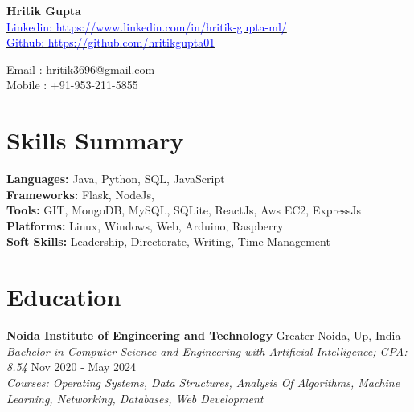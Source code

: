 \documentclass[9pt]{article}
\begin{document}
\small

\begin{minipage}[t]{0.6\textwidth}
  {\LARGE\textbf{Hritik Gupta}} \\
  \vspace{2pt}
  \href{https://www.linkedin.com/in/hritik-gupta-ml/}{\textcolor{blue}{Linkedin: https://www.linkedin.com/in/hritik-gupta-ml/}} \\
  \href{https://github.com/hritikgupta01}{\textcolor{blue}{Github: https://github.com/hritikgupta01}}
\end{minipage}%
\begin{minipage}[t]{0.4\textwidth}
  \raggedleft
  Email : \href{mailto:hritik3696@gmail.com}{hritik3696@gmail.com} \\
  Mobile : +91-953-211-5855
\end{minipage}

\vspace{0.5em}

\section*{Skills Summary}
\textbf{Languages:} Java, Python, SQL, JavaScript \\
\textbf{Frameworks:} Flask, NodeJs, \\
\textbf{Tools:} GIT, MongoDB, MySQL, SQLite, ReactJs, Aws EC2, ExpressJs \\
\textbf{Platforms:} Linux, Windows, Web, Arduino, Raspberry \\
\textbf{Soft Skills:} Leadership, Directorate, Writing, Time Management

\section*{Education}
\textbf{Noida Institute of Engineering and Technology} \hfill Greater Noida, Up, India \\
\textit{Bachelor in Computer Science and Engineering with Artificial Intelligence; GPA: 8.54} \hfill Nov 2020 - May 2024 \\
\textit{Courses: Operating Systems, Data Structures, Analysis Of Algorithms, Machine Learning, Networking, Databases, Web Development}

\end{document}
